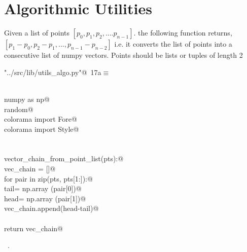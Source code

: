 \documentclass[11.5pt]{report}
\begin{document}
\section{Algorithmic Utilities}

\newchunk Given a list of  points $[p_0,p_1,p_2,....p_{n-1}]$. 
    the following function returns, $[p_1-p_0, p_2-p_1,...,p_{n-1}-p_{n-2}]$
    i.e. it converts the list of points into a consecutive list of numpy vectors. 
    Points should be lists or tuples of length 2

\begin{flushleft} \small\label{scrap12}\raggedright\small
{} \verb@"../src/lib/utils_algo.py"@\nobreak\ {\footnotesize {17a}}$\equiv$
\vspace{-1ex}
\begin{list}{}{} \item
\mbox{}\verb@@\\
\mbox{}\verb@import numpy as np@\\
\mbox{}\verb@import random@\\
\mbox{}\verb@from colorama import Fore@\\
\mbox{}\verb@from colorama import Style@\\
\mbox{}\verb@@\\
\mbox{}\verb@@\\
\mbox{}\verb@def vector_chain_from_point_list(pts):@\\
\mbox{}\verb@    vec_chain = []@\\
\mbox{}\verb@    for pair in zip(pts, pts[1:]):@\\
\mbox{}\verb@        tail= np.array (pair[0])@\\
\mbox{}\verb@        head= np.array (pair[1])@\\
\mbox{}\verb@        vec_chain.append(head-tail)@\\
\mbox{}\verb@@\\
\mbox{}\verb@    return vec_chain@\\
\mbox{}\verb@@{\NWsep}
\end{list}
\vspace{-1.5ex}
\footnotesize
\begin{list}{}{\setlength{\itemsep}{-\parsep}\setlength{\itemindent}{-\leftmargin}}
\item \NWtxtFileDefBy\ .

\item{}
\end{list}
\vspace{4ex}
\end{flushleft}
\end{document}
